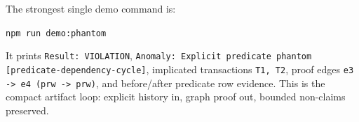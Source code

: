 \documentclass[10pt]{article}
\newcommand{\code}[1]{\texttt{#1}}
\begin{document}
The strongest single demo command is:

\begin{center}
\code{npm run demo:phantom}
\end{center}

It prints \code{Result: VIOLATION}, \code{Anomaly: Explicit predicate phantom [predicate-dependency-cycle]}, implicated transactions \code{T1, T2}, proof edges \code{e3 -> e4 (prw -> prw)}, and before/after predicate row evidence. This is the compact artifact loop: explicit history in, graph proof out, bounded non-claims preserved.
\end{document}
